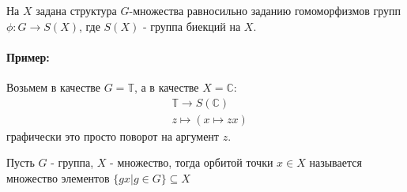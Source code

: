 \begin{Def}
На $X$ задана структура $G$-множества равносильно заданию гомоморфизмов групп $\phi: G \rightarrow S\left(X\right)$, где $S\left(X\right)$ - группа биекций на $X$.
\end{Def}

\paragraph{Пример:}
Возьмем в качестве $G = \mathbb{T}$, а в качестве $X = \mathbb{C}$:
\[
	\begin{split}
		& \mathbb{T} \rightarrow S\left(\mathbb{C}\right) \\
		& z \mapsto \left(x \mapsto zx\right)
	\end{split}
\]
графически это просто поворот на аргумент $z$.

\begin{Def}
Пусть $G$ - группа, $X$ - множество, тогда орбитой точки $x \in X$ называется множество элементов $\{gx | g \in G\} \subseteq X$
\end{Def}
